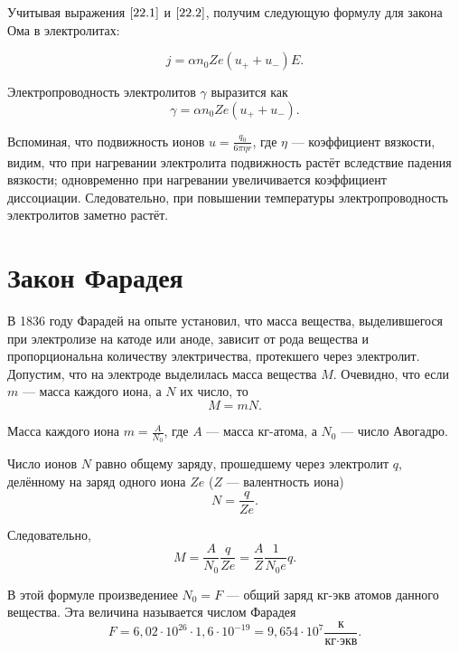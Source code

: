 \documentclass[a4paper,10pt]{book}
\begin{document}
Учитывая выражения $\ref{22.1}$ и $\ref{22.2}$, получим следующую формулу для закона Ома в электролитах:

\begin{equation}\label{22.3}
j = \alpha n_0 Ze (u_+ + u_-)E.
\end{equation}

Электропроводность электролитов $\gamma$ выразится как\begin{equation}\label{22.4}
\gamma = \alpha n_0 Ze (u_+ + u_-).
\end{equation}

Вспоминая, что подвижность ионов $u=\frac{q_0}{6\pi \eta r}$, где $\eta$ — коэффициент вязкости, видим, что при нагревании электролита подвижность растёт вследствие падения вязкости; одновременно при нагревании увеличивается коэффициент диссоциации. Следовательно, при повышении температуры электропроводность электролитов заметно растёт.

\section{Закон Фарадея}

В 1836 году Фарадей на опыте установил, что масса вещества, выделившегося при электролизе на катоде или аноде, зависит от рода вещества и пропорциональна количеству электричества, протекшего через электролит. Допустим, что на электроде выделилась масса вещества $M$. Очевидно, что если $m$ — масса каждого иона, а $N$ их число, то \begin{equation*}
M=mN.
\end{equation*}

Масса каждого иона $m=\frac{A}{N_0}$, где $A$ — масса $\textit{кг-атома}$, а $N_0$ — число Авогадро.

Число ионов $N$ равно общему заряду, прошедшему через электролит $q$, делённому на заряд одного иона $Ze$ ($Z$ — валентность иона)\begin{equation*}
N=\frac{q}{Ze}.
\end{equation*}

Следовательно, \begin{equation*}
M=\frac{A}{N_0}\frac{q}{Ze} = \frac{A}{Z}\frac{1}{N_0 e}q.
\end{equation*}

В этой формуле произведениее $N_0 = F$ — общий заряд $\textit{кг-экв}$ атомов данного вещества. Эта величина называется числом Фарадея\begin{equation*}
F=6,02\cdot10^{26}\cdot1,6\cdot10^{-19} = 9,654 \cdot 10^7  \frac{\textit{к}}{\textit{кг}\cdot\textit{экв}}.
\end{equation*}
\end{document}
